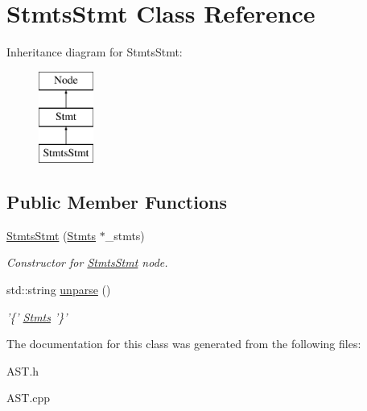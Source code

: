 \hypertarget{classStmtsStmt}{\section{Stmts\-Stmt Class Reference}
\label{classStmtsStmt}
}
Inheritance diagram for Stmts\-Stmt\-:\begin{figure}[H]
\begin{center}
\leavevmode
\includegraphics[height=3.000000cm]{classStmtsStmt}
\end{center}
\end{figure}
\subsection*{Public Member Functions}
\begin{DoxyCompactItemize}
\item 
\hypertarget{classStmtsStmt_af8ddc1af257db7a5b0718186a62c9917}{\hyperlink{classStmtsStmt_af8ddc1af257db7a5b0718186a62c9917}{Stmts\-Stmt} (\hyperlink{classStmts}{Stmts} $\ast$\-\_\-stmts)}\label{classStmtsStmt_af8ddc1af257db7a5b0718186a62c9917}

\begin{DoxyCompactList}\small\item\em Constructor for \hyperlink{classStmtsStmt}{Stmts\-Stmt} node. \end{DoxyCompactList}\item 
\hypertarget{classStmtsStmt_a07ac4d7fa031302a8e05e368fe8f4779}{std\-::string \hyperlink{classStmtsStmt_a07ac4d7fa031302a8e05e368fe8f4779}{unparse} ()}\label{classStmtsStmt_a07ac4d7fa031302a8e05e368fe8f4779}

\begin{DoxyCompactList}\small\item\em '\{' \hyperlink{classStmts}{Stmts} '\}' \end{DoxyCompactList}\end{DoxyCompactItemize}


The documentation for this class was generated from the following files\-:\begin{DoxyCompactItemize}
\item 
A\-S\-T.\-h\item 
A\-S\-T.\-cpp\end{DoxyCompactItemize}
